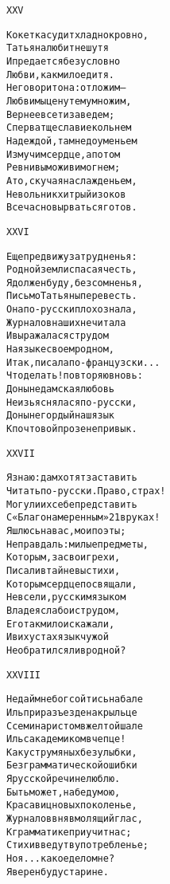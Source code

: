 \begin{minipage}[t]{\dimexpr 0.5\textwidth -\tabcolsep-.5pt}
\begin{alltt}\normalfont\centering
XXV

Кокетка судит хладнокровно,
Татьяна любит не шутя
И предается безусловно
Любви, как милое дитя.
Не говорит она: отложим —
Любви мы цену тем умножим,
Вернее в сети заведем;
Сперва тщеславие кольнем
Надеждой, там недоуменьем
Измучим сердце, а потом
Ревнивым оживим огнем;
А то, скучая наслажденьем,
Невольник хитрый из оков
Всечасно вырваться готов.
\end{alltt}
\end{minipage}

\begin{minipage}[t]{\dimexpr 0.5\textwidth -\tabcolsep-.5pt}
\begin{alltt}\normalfont\centering
XXVI

Еще предвижу затрудненья:
Родной земли спасая честь,
Я должен буду, без сомненья,
Письмо Татьяны перевесть.
Она по-русски плохо знала,
Журналов наших не читала
И выражалася с трудом
На языке своем родном,
Итак, писала по-французски...
Что делать! повторяю вновь:
Доныне дамская любовь
Не изьяснялася по-русски,
Доныне гордый наш язык
К почтовой прозе не привык.
\end{alltt}
\end{minipage}
\clearpage

\begin{minipage}[t]{\dimexpr 0.5\textwidth -\tabcolsep-.5pt}
\begin{alltt}\normalfont\centering
XXVII

Я знаю: дам хотят заставить
Читать по-русски. Право, страх!
Могу ли их себе представить
С «Благонамеренным» 21 в руках!
Я шлюсь на вас, мои поэты;
Не правда ль: милые предметы,
Которым, за свои грехи,
Писали втайне вы стихи,
Которым сердце посвящали,
Не все ли, русским языком
Владея слабо и с трудом,
Его так мило искажали,
И в их устах язык чужой
Не обратился ли в родной?
\end{alltt}
\end{minipage}

\begin{minipage}[t]{\dimexpr 0.5\textwidth -\tabcolsep-.5pt}
\begin{alltt}\normalfont\centering
XXVIII

Не дай мне бог сойтись на бале
Иль при разъезде на крыльце
С семинаристом в желтой шале
Иль с академиком в чепце!
Как уст румяных без улыбки,
Без грамматической ошибки
Я русской речи не люблю.
Быть может, на беду мою,
Красавиц новых поколенье,
Журналов вняв молящий глас,
К грамматике приучит нас;
Стихи введут в употребленье;
Но я... какое дело мне?
Я верен буду старине.
\end{alltt}
\end{minipage}
\clearpage

